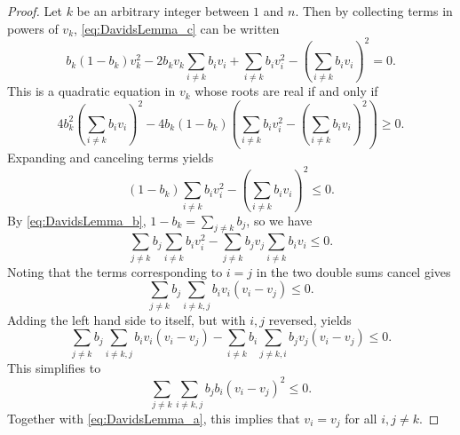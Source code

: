 \begin{proof}
    Let \( k \) be an arbitrary integer between \( 1 \) and \( n \). Then by collecting terms in powers of \( v_k \),
\eqref{eq:DavidsLemma_c} can be written
\begin{equation*}
  b_{k}(1-b_{k})v_{k}^{2} - 2b_{k}v_{k}\sum_{i \neq k}b_{i}v_{i} + \sum_{i \neq k}b_{i}v_{i}^{2} - \left(\sum_{i \neq k}b_{i}v_{i}\right)^{2} = 0.
\end{equation*}
This is a quadratic equation in \( v_{k} \) whose roots are real if and only if
\begin{equation*}
    4b_{k}^{2}\left(\sum_{i \neq k}b_{i}v_{i}\right)^{2} - 4b_{k}(1-b_{k})\left(\sum_{i \neq k}b_{i}v_{i}^{2} - \left(\sum_{i \neq k}b_{i}v_{i}\right)^{2}\right) \geq 0.
\end{equation*}
Expanding and canceling terms yields
\begin{equation*}
    (1-b_{k})\sum_{i \neq k}b_{i}v_{i}^{2} - \left(\sum_{i \neq k}b_{i}v_{i} \right)^{2} \leq 0.
\end{equation*}
By \eqref{eq:DavidsLemma_b}, \( 1-b_{k} = \sum_{j \ne k}b_{j} \), so we have
\begin{equation*}
    \sum_{j \neq k}b_{j}\sum_{i \neq k}b_{i}v_{i}^{2} - \sum_{j \neq k}b_{j}v_{j}\sum_{i \neq k}b_{i}v_{i} \le 0.
\end{equation*}
Noting that the terms corresponding to \( i = j \) in the two double sums cancel gives
\begin{equation*}
    \sum_{j \neq k}b_{j}\sum_{i \neq k,j}b_{i}v_{i}(v_{i} - v_{j}) \leq 0.
\end{equation*}
Adding the left hand side to itself, but with \( i,j \) reversed, yields
\begin{equation*}
    \sum_{j \neq k}b_{j}\sum_{i \neq k,j}b_{i}v_{i}(v_{i} - v_{j}) - \sum_{i \neq k}b_{i}\sum_{j \neq k,i}b_{j}v_{j}(v_{i} - v_{j}) \leq 0.
\end{equation*}
This simplifies to
\begin{equation*}
    \sum_{j \neq k}\sum_{i \neq k,j}b_{j}b_{i}(v_{i} - v_{j})^{2} \leq 0.
\end{equation*}
Together with \eqref{eq:DavidsLemma_a}, this implies that \( v_{i} = v_{j} \) for all \( i,j \neq k \).
\end{proof}

